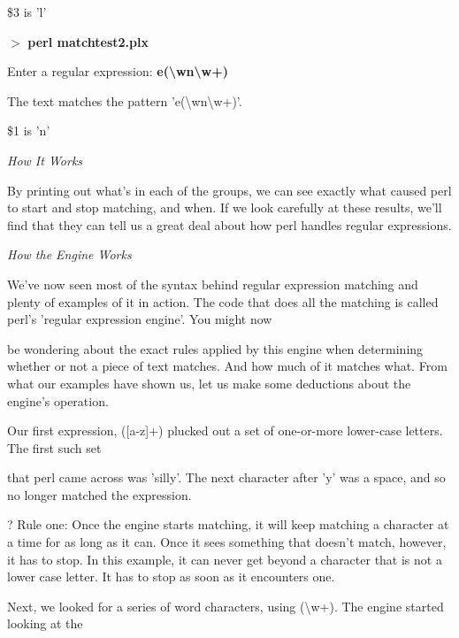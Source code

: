 \documentclass[a4paper,11pt]{book}
\begin{document}
\noindent \$3 is 'l'

\noindent 

\noindent $>$ \textbf{perl matchtest2.plx}

\noindent Enter a regular expression: \textbf{e(\textbackslash w\textbar n\textbackslash w+)}

\noindent The text matches the pattern 'e(\textbackslash w\textbar n\textbackslash w+)'.

\noindent \$1 is 'n'

\noindent 

\noindent \textit{How It Works}

\noindent By printing out what's in each of the groups, we can see exactly what caused perl to start and stop matching, and when. If we look carefully at these results, we'll find that they can tell us a great deal about how perl handles regular expressions.

\noindent 

\noindent \textit{How the Engine Works}

\noindent We've now seen most of the syntax behind regular expression matching and plenty of examples of it in action. The code that does all the matching is called perl's 'regular expression engine'. You might now

\noindent be wondering about the exact rules applied by this engine when determining whether or not a piece of text matches. And how much of it matches what. From what our examples have shown us, let us make some deductions about the engine's operation.

\noindent 

\noindent 

\noindent Our first expression, ([a-z]+) plucked out a set of one-or-more lower-case letters. The first such set

\noindent that perl came across was 'silly'. The next character after 'y' was a space, and so no longer matched the expression.

\noindent 

\noindent ? Rule  one: Once the engine starts matching, it will keep matching a character at a time for as long as it can. Once it sees something that doesn't match, however, it has to stop. In this example, it can never get beyond a character that is not a lower case letter. It has to stop as soon as it encounters one.

\noindent 

\noindent Next, we looked for a series of word characters, using (\textbackslash w+). The engine started looking at the
\end{document}
